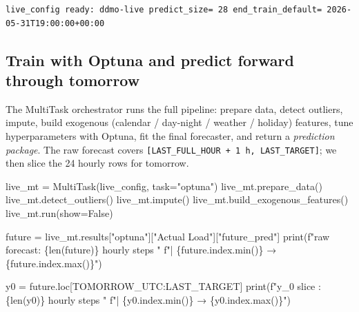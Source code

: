\documentclass[
  english,
  letterpaper,
]{scrbook}
\newenvironment{Shaded}{\begin{snugshade}}{\end{snugshade}}
\newcommand{\BuiltInTok}[1]{\textcolor[rgb]{0.00,0.23,0.31}{#1}}
\newcommand{\NormalTok}[1]{\textcolor[rgb]{0.00,0.23,0.31}{#1}}
\newcommand{\OperatorTok}[1]{\textcolor[rgb]{0.37,0.37,0.37}{#1}}
\newcommand{\SpecialCharTok}[1]{\textcolor[rgb]{0.37,0.37,0.37}{#1}}
\newcommand{\SpecialStringTok}[1]{\textcolor[rgb]{0.13,0.47,0.30}{#1}}
\newcommand{\StringTok}[1]{\textcolor[rgb]{0.13,0.47,0.30}{#1}}
\newcommand{\VariableTok}[1]{\textcolor[rgb]{0.07,0.07,0.07}{#1}}
\begin{document}
\begin{verbatim}
live_config ready: ddmo-live predict_size= 28 end_train_default= 2026-05-31T19:00:00+00:00
\end{verbatim}

\subsection{Train with Optuna and predict forward through
tomorrow}\label{train-with-optuna-and-predict-forward-through-tomorrow}

The MultiTask orchestrator runs the full pipeline: prepare data, detect
outliers, impute, build exogenous (calendar / day-night / weather /
holiday) features, tune hyperparameters with Optuna, fit the final
forecaster, and return a \emph{prediction package}. The raw forecast
covers \texttt{{[}LAST\_FULL\_HOUR\ +\ 1\ h,\ LAST\_TARGET{]}}; we then
slice the 24 hourly rows for tomorrow.

\protect{}\label{live-train}
\begin{Shaded}
\begin{Highlighting}[]
\NormalTok{live\_mt }\OperatorTok{=}\NormalTok{ MultiTask(live\_config, task}\OperatorTok{=}\StringTok{"optuna"}\NormalTok{)}
\NormalTok{live\_mt.prepare\_data()}
\NormalTok{live\_mt.detect\_outliers()}
\NormalTok{live\_mt.impute()}
\NormalTok{live\_mt.build\_exogenous\_features()}
\NormalTok{live\_mt.run(show}\OperatorTok{=}\VariableTok{False}\NormalTok{)}

\NormalTok{future }\OperatorTok{=}\NormalTok{ live\_mt.results[}\StringTok{"optuna"}\NormalTok{][}\StringTok{"Actual Load"}\NormalTok{][}\StringTok{"future\_pred"}\NormalTok{]}
\BuiltInTok{print}\NormalTok{(}\SpecialStringTok{f"raw forecast: }\SpecialCharTok{\{}\BuiltInTok{len}\NormalTok{(future)}\SpecialCharTok{\}}\SpecialStringTok{ hourly steps "}
      \SpecialStringTok{f"| }\SpecialCharTok{\{}\NormalTok{future}\SpecialCharTok{.}\NormalTok{index}\SpecialCharTok{.}\BuiltInTok{min}\NormalTok{()}\SpecialCharTok{\}}\SpecialStringTok{ → }\SpecialCharTok{\{}\NormalTok{future}\SpecialCharTok{.}\NormalTok{index}\SpecialCharTok{.}\BuiltInTok{max}\NormalTok{()}\SpecialCharTok{\}}\SpecialStringTok{"}\NormalTok{)}

\NormalTok{y0 }\OperatorTok{=}\NormalTok{ future.loc[TOMORROW\_UTC:LAST\_TARGET]}
\BuiltInTok{print}\NormalTok{(}\SpecialStringTok{f"y\_0 slice   : }\SpecialCharTok{\{}\BuiltInTok{len}\NormalTok{(y0)}\SpecialCharTok{\}}\SpecialStringTok{ hourly steps "}
      \SpecialStringTok{f"| }\SpecialCharTok{\{}\NormalTok{y0}\SpecialCharTok{.}\NormalTok{index}\SpecialCharTok{.}\BuiltInTok{min}\NormalTok{()}\SpecialCharTok{\}}\SpecialStringTok{ → }\SpecialCharTok{\{}\NormalTok{y0}\SpecialCharTok{.}\NormalTok{index}\SpecialCharTok{.}\BuiltInTok{max}\NormalTok{()}\SpecialCharTok{\}}\SpecialStringTok{"}\NormalTok{)}
\end{Highlighting}
\end{Shaded}
\end{document}
